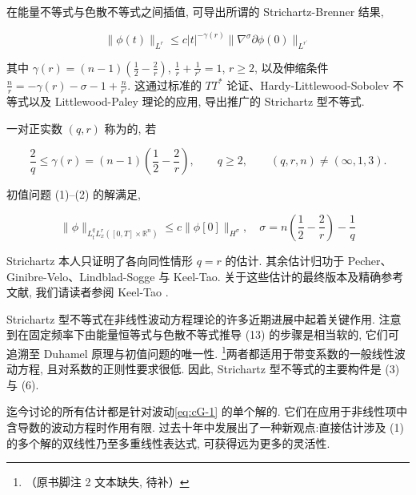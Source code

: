 在能量不等式与色散不等式之间插值, 可导出所谓的 Strichartz-Brenner 结果, 

\[
\| \phi (t) \| _ {L ^ {r}} \leq c | t | ^ {- \gamma (r)} \| \nabla^ {\sigma} \partial \phi (0) \| _ {L ^ {r ^ {\prime}}}
\]

其中 $\gamma(r)=(n-1)(\frac{1}{2}-\frac{2}{r})$, $\frac{1}{r}+\frac{1}{r'}=1$, $r\geq2$, 以及伸缩条件 $\frac{n}{r}=-\gamma(r)-\sigma-1+\frac{n}{r'}$. 这通过标准的 $TT^{*}$ 论证、Hardy-Littlewood-Sobolev 不等式以及 Littlewood-Paley 理论的应用, 导出推广的 Strichartz 型不等式. 

\begin{definition}\label{def:cG-1.10}
一对正实数 $(q, r)$ 称为的, 若

\[
\frac {2}{q} \leq \gamma (r) = (n - 1) (\frac {1}{2} - \frac {2}{r}),  \qquad q \geq 2,  \qquad (q,  r,  n) \neq (\infty ,  1,  3).
\]
\end{definition}

\begin{proposition}\label{prop:cG-1.11}
初值问题 (1)--(2) 的解满足, 

\begin{equation}
\| \phi \| _ {L _ {t} ^ {q} L _ {x} ^ {r} ([ 0,  T ] \times \mathbb {R} ^ {n})} \leq c \| \phi [ 0 ] \| _ {H ^ {\sigma}},  \quad \sigma = n (\frac {1}{2} - \frac {2}{r}) - \frac {1}{q}\label{eq:cG-13}
\end{equation}
\end{proposition}

\begin{remark}\label{rem:cG-1.12}
Strichartz 本人只证明了各向同性情形 $q = r$ 的估计. 其余估计归功于 Pecher、Ginibre-Velo、Lindblad-Sogge 与 Keel-Tao. 关于这些估计的最终版本及精确参考文献, 我们请读者参阅 Keel-Tao \cite{gfref20}. 
\end{remark}

\begin{remark}\label{rem:cG-1.13}
Strichartz 型不等式在非线性波动方程理论的许多近期进展中起着关键作用. 注意到在固定频率下由能量恒等式与色散不等式推导 (13) 的步骤是相当软的, 它们可追溯至 Duhamel 原理与初值问题的唯一性. \footnote{（原书脚注 2 文本缺失, 待补）}两者都适用于带变系数的一般线性波动方程, 且对系数的正则性要求很低. 因此, Strichartz 型不等式的主要构件是 (3) 与 (6). 
\end{remark}

迄今讨论的所有估计都是针对波动\eqref{eq:cG-1} 的单个解的. 它们在应用于非线性项中含导数的波动方程时作用有限. 过去十年中发展出了一种新观点:直接估计涉及 (1) 的多个解的双线性乃至多重线性表达式, 可获得远为更多的灵活性. 

